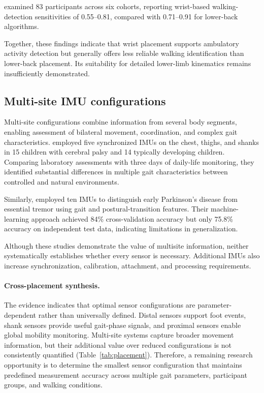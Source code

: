\documentclass[10pt,a4paper,twocolumn]{article}
\begin{document}
\citet{kluge2024} examined 83 participants across six cohorts, reporting wrist-based walking-detection sensitivities of 0.55--0.81, compared with 0.71--0.91 for lower-back algorithms.

Together, these findings indicate that wrist placement supports ambulatory activity detection but generally offers less reliable walking identification than lower-back placement. Its suitability for detailed lower-limb kinematics remains insufficiently demonstrated.

\subsection{Multi-site IMU configurations}

Multi-site configurations combine information from several body segments, enabling assessment of bilateral movement, coordination, and complex gait characteristics. \citet{carcreff2020} employed five synchronized IMUs on the chest, thighs, and shanks in 15 children with cerebral palsy and 14 typically developing children. Comparing laboratory assessments with three days of daily-life monitoring, they identified substantial differences in multiple gait characteristics between controlled and natural environments.

Similarly, \citet{lin2023} employed ten IMUs to distinguish early Parkinson's disease from essential tremor using gait and postural-transition features. Their machine-learning approach achieved 84\% cross-validation accuracy but only 75.8\% accuracy on independent test data, indicating limitations in generalization.

Although these studies demonstrate the value of multisite information, neither systematically establishes whether every sensor is necessary. Additional IMUs also increase synchronization, calibration, attachment, and processing requirements.

\paragraph{Cross-placement synthesis.} The evidence indicates that optimal sensor configurations are parameter-dependent rather than universally defined. Distal sensors support foot events, shank sensors provide useful gait-phase signals, and proximal sensors enable global mobility monitoring. Multi-site systems capture broader movement information, but their additional value over reduced configurations is not consistently quantified (Table~\ref{tab:placement}). Therefore, a remaining research opportunity is to determine the smallest sensor configuration that maintains predefined measurement accuracy across multiple gait parameters, participant groups, and walking conditions.
\end{document}
